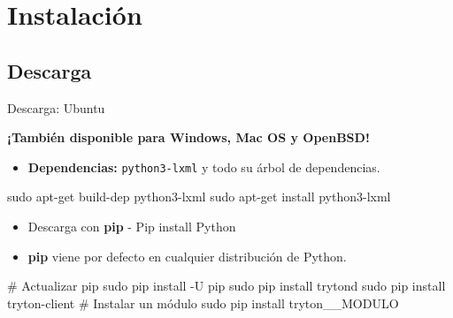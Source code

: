 

\section{Instalación}

    \subsection{Descarga}

	\begin{frame}[fragile=singleslide]{Descarga: Ubuntu}

        \begin{center}
            {\color{TurkishRose}\textbf{¡También disponible para Windows, Mac OS y OpenBSD!}}
        \end{center}

        \fontsize{10}{8}\selectfont

        \begin{itemize}
            \item \textbf{Dependencias:} \texttt{python3-lxml} y todo su árbol de dependencias.
        \end{itemize}

        \begin{mycode}[bash]
sudo apt-get build-dep python3-lxml
sudo apt-get install python3-lxml
		\end{mycode}

        \begin{itemize}
            \item Descarga con \textbf{pip} - Pip install Python
            \item \textbf{pip} viene por defecto en cualquier distribución de Python.
        \end{itemize}

        \begin{mycode}[bash]
# Actualizar pip
sudo pip install -U pip
sudo pip install trytond
sudo pip install tryton-client
# Instalar un módulo
sudo pip install tryton__MODULO
        \end{mycode}

    \end{frame}

